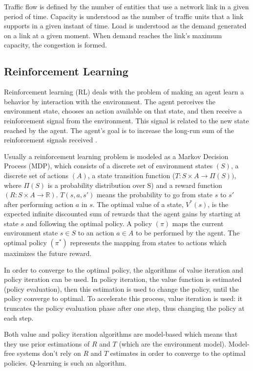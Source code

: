 \documentclass[12pt]{article}
\begin{document}
Traffic flow is defined by the number of entities that use a network link in a given period of time. Capacity is understood as the number of traffic units that a link supports in a given instant of time. Load is understood as the demand generated on a link at a given moment. When demand reaches the link's maximum capacity, the congestion is formed.

\subsection{Reinforcement Learning}

Reinforcement learning (RL) deals with the problem of making an agent learn a behavior by interaction with the environment. The agent perceives the environment state, chooses an action available on that state, and then receive a reinforcement signal from the environment. This signal is related to the new state reached by the agent. The agent's goal is to increase the long-run sum of the reinforcement signals received \cite{Kaelbling+1996}.

Usually a reinforcement learning problem is modeled as a Markov Decision Process (MDP), which consists of a discrete set of environment states $(S)$, a discrete set of actions $(A)$, a state transition function ($T: S \times A \to \Pi(S))$, where $\Pi(S)$ is a probability distribution over S) and a reward function $(R: S \times A \to \mathbb{R})$. $T(s, a, s')$ means the probability to go from state $s$ to $s'$ after performing action $a$ in $s$.
The optimal value of a state, $V^*(s)$, is the expected infinite discounted sum of rewards that the agent gains by starting at state $s$ and following the optimal policy. A policy $(\pi)$ maps the current environment state $s \in S$ to an action $a \in A$ to be performed by the agent. The optimal policy $(\pi^*)$ represents the mapping from states to actions which maximizes the future reward.

In order to converge to the optimal policy, the algorithms of value iteration and policy iteration can be used. In policy iteration, the value function is estimated (policy evaluation), then this estimation is used to change the policy, until the policy converge to optimal. To accelerate this process, value iteration is used: it truncates the policy evaluation phase after one step, thus changing the policy at each step.

Both value and policy iteration algorithms are model-based which means that they use prior estimations of $R$ and $T$ (which are the environment model). Model-free systems don't rely on $R$ and $T$ estimates in order to converge to the optimal policies. Q-learning \cite{Watkins&Dayan1992} is such an algorithm.
\end{document}
